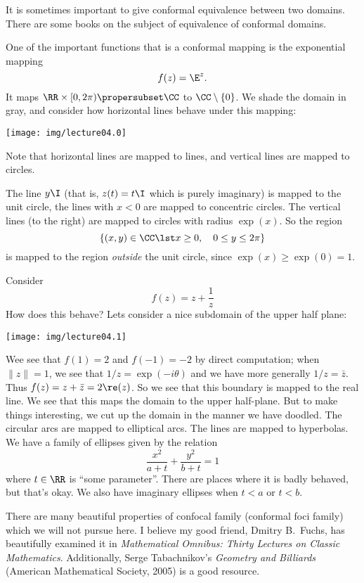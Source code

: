 It is sometimes important to give conformal equivalence between
two domains. There are some books on the subject of equivalence
of conformal domains.

\begin{ex}
One of the important functions that is a conformal mapping is the
exponential mapping
\begin{equation}
f(z)=\E^{z}.
\end{equation}
It maps $\RR\times[0,2\pi)\propersubset\CC$ to
$\CC\setminus\{0\}$. We shade the domain in gray, and consider
how horizontal lines behave under this mapping:
\begin{center}
\texttt{[image: img/lecture04.0]}
\end{center}
Note that horizontal lines are mapped to lines, and vertical
lines are mapped to circles.

The line $y\I$ (that is, $z(t)=t\I$ which is purely imaginary) is
mapped to the unit circle, the lines with $x<0$ are mapped to
concentric circles. The vertical lines (to the right) are mapped
to circles with radius $\exp(x)$.
So the region 
$$\{(x,y)\in\CC\lst x\geq0,\quad 0\leq y\leq2\pi\}$$
is mapped to the region \emph{outside} the unit circle, since
$\exp(x)\geq\exp(0)=1$. 
\end{ex}
\begin{ex}
Consider
\begin{equation}
f(z)=z+\frac{1}{z}
\end{equation}
How does this behave? Lets consider a nice subdomain of the upper
half plane:
\begin{center}
\texttt{[image: img/lecture04.1]}
\end{center}
Wee see that $f(1)=2$ and $f(-1)=-2$ by direct computation; when
$\|z\|=1$, we see that $1/z=\exp(-i\theta)$ and we have more
generally $1/z=\bar{z}$. Thus $f(z)=z+\bar{z}=2\re(z)$. So we see
that this boundary is mapped to the real line. We see that this
maps the domain to the upper half-plane. But to make things
interesting, we cut up the domain in the manner we have
doodled. The circular arcs are mapped to elliptical arcs. The
lines are mapped to hyperbolas. We have a family of ellipses
given by the relation
\begin{equation}
\frac{x^{2}}{a+t}+\frac{y^{2}}{b+t}=1
\end{equation}
where $t\in\RR$ is ``some parameter''. There are places where it
is badly behaved, but that's okay. We also have imaginary
ellipses when $t<a$ or $t<b$.
\end{ex}
There are many beautiful properties of confocal family (conformal
foci family) which we will not pursue here. I believe my good
friend, Dmitry B.\ Fuchs, has beautifully examined it in
\emph{Mathematical Omnibus: Thirty Lectures on Classic Mathematics}. 
Additionally, Serge Tabachnikov's \emph{Geometry and Billiards}
(American Mathematical Society, 2005) is a good resource.


